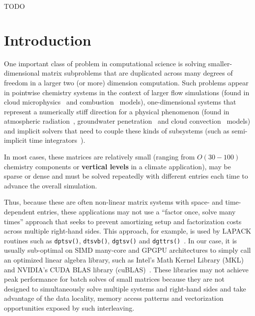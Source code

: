 \documentclass[10pt, conference, compsocconf]{IEEEtran}
\begin{document}
\begin{IEEEkeywords}
TODO
\end{IEEEkeywords}

\section{Introduction}
\label{sec:intro}

One important class of problem in computational science is solving
  smaller-dimensional matrix subproblems that are duplicated across
  many degrees of freedom in a larger two (or more) dimension computation.
Such problems appear in
  pointwise chemistry systems in the context of larger 
    flow simulations (found in cloud microphysics~\cite{climate_mg2} and
    combustion~\cite{combustion_pazner} models),
  one-dimensional systems that represent a numerically stiff
    direction for a physical phenomenon (found in atmospheric
    radiation~\cite{climate_rrtmg}, groundwater
    penetration~\cite{pflotran_groundwater} and cloud
    convection~\cite{climate_sam} models) and
  implicit solvers that need to couple these kinds of subsystems
    (such as semi-implicit time integrators~\cite{imex}).

In most cases, these matrices are relatively small 
  (ranging from \(O(30-100)\) chemistry components or \textbf{vertical levels}
  in a climate application), may be sparse or dense and must be solved
  repeatedly with different entries each time to advance the overall simulation.

Thus, because these are often non-linear matrix systems with space- and 
  time-dependent entries, these applications may not use a 
  ``factor once, solve many times'' approach that seeks to prevent amortizing
  setup and factorization costs across multiple right-hand sides.
This approach, for example, is used by 
  LAPACK routines such as \lstinline{dptsv()}, \lstinline{dtsvb()},
  \lstinline{dgtsv()} and
  \lstinline{dgttrs()}~\cite{mkl}.
In our case, it is usually sub-optimal on SIMD many-core and GPGPU
  architectures to simply call an optimized linear algebra library, 
  such as Intel's Math Kernel Library (MKL)~\cite{mkl} and NVIDIA's
  CUDA BLAS library (cuBLAS)~\cite{cublas}.
These libraries may not achieve peak performance for batch solves of small
  matrices because they are not designed to simultaneously solve multiple systems
  and right-hand sides and take advantage of the data locality, memory
  access patterns and vectorization opportunities exposed by such interleaving. 
  
\end{document}
